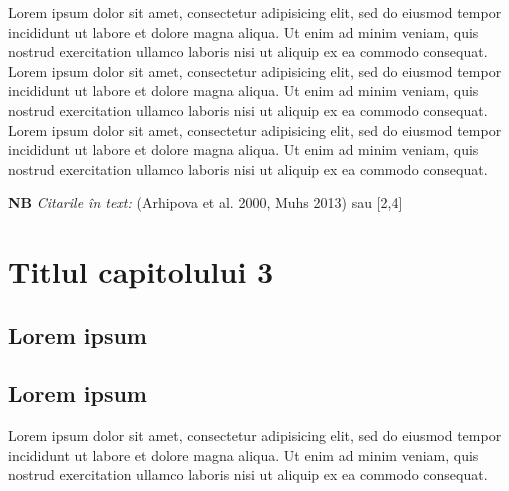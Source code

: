 \documentclass[12pt,openright,twoside]{book}
\begin{document}
Lorem ipsum dolor sit amet, consectetur adipisicing elit, sed do eiusmod tempor incididunt ut labore et dolore magna aliqua. Ut enim ad minim veniam, quis nostrud exercitation ullamco laboris nisi ut aliquip ex ea commodo consequat.\\

Lorem ipsum dolor sit amet, consectetur adipisicing elit, sed do eiusmod tempor incididunt ut labore et dolore magna aliqua. Ut enim ad minim veniam, quis nostrud exercitation ullamco laboris nisi ut aliquip ex ea commodo consequat.\\

Lorem ipsum dolor sit amet, consectetur adipisicing elit, sed do eiusmod tempor incididunt ut labore et dolore magna aliqua. Ut enim ad minim veniam, quis nostrud exercitation ullamco laboris nisi ut aliquip ex ea commodo consequat.\\

\vspace{40pt}


\noindent\textbf{NB} \textit{Citarile \^in text: }(Arhipova et al. 2000, Muhs 2013) sau [2,4]



\chapter{Titlul capitolului 3}

\section{Lorem ipsum }

\section{Lorem ipsum }

Lorem ipsum dolor sit amet, consectetur adipisicing elit, sed do eiusmod tempor incididunt ut labore et dolore magna aliqua. Ut enim ad minim veniam, quis nostrud exercitation ullamco laboris nisi ut aliquip ex ea commodo consequat. \\
\end{document}
